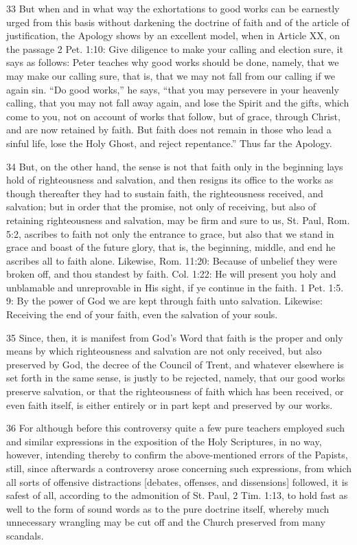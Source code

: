 33 But when and in what way the exhortations to good works can be earnestly urged from this basis without darkening the doctrine of faith and of the article of justification, the Apology shows by an excellent model, when in Article XX, on the passage 2 Pet. 1:10: Give diligence to make your calling and election sure, it says as follows: Peter teaches why good works should be done, namely, that we may make our calling sure, that is, that we may not fall from our calling if we again sin. “Do good works,” he says, “that you may persevere in your heavenly calling, that you may not fall away again, and lose the Spirit and the gifts, which come to you, not on account of works that follow, but of grace, through Christ, and are now retained by faith. But faith does not remain in those who lead a sinful life, lose the Holy Ghost, and reject repentance.” Thus far the Apology.

34 But, on the other hand, the sense is not that faith only in the beginning lays hold of righteousness and salvation, and then resigns its office to the works as though thereafter they had to sustain faith, the righteousness received, and salvation; but in order that the promise, not only of receiving, but also of retaining righteousness and salvation, may be firm and sure to us, St. Paul, Rom. 5:2, ascribes to faith not only the entrance to grace, but also that we stand in grace and boast of the future glory, that is, the beginning, middle, and end he ascribes all to faith alone. Likewise, Rom. 11:20: Because of unbelief they were broken off, and thou standest by faith. Col. 1:22: He will present you holy and unblamable and unreprovable in His sight, if ye continue in the faith. 1 Pet. 1:5. 9: By the power of God we are kept through faith unto salvation. Likewise: Receiving the end of your faith, even the salvation of your souls.

35 Since, then, it is manifest from God’s Word that faith is the proper and only means by which righteousness and salvation are not only received, but also preserved by God, the decree of the Council of Trent, and whatever elsewhere is set forth in the same sense, is justly to be rejected, namely, that our good works preserve salvation, or that the righteousness of faith which has been received, or even faith itself, is either entirely or in part kept and preserved by our works.

36 For although before this controversy quite a few pure teachers employed such and similar expressions in the exposition of the Holy Scriptures, in no way, however, intending thereby to confirm the above-mentioned errors of the Papists, still, since afterwards a controversy arose concerning such expressions, from which all sorts of offensive distractions [debates, offenses, and dissensions] followed, it is safest of all, according to the admonition of St. Paul, 2 Tim. 1:13, to hold fast as well to the form of sound words as to the pure doctrine itself, whereby much unnecessary wrangling may be cut off and the Church preserved from many scandals.

